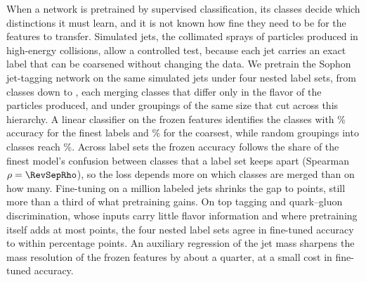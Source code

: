 When a network is pretrained by supervised classification, its classes decide which distinctions it must learn, and it
is not known how fine they need to be for the features to transfer.
Simulated jets, the collimated sprays of particles produced in high-energy collisions, allow a controlled test,
because each jet carries an exact label that can be coarsened without changing the data.
We pretrain the Sophon jet-tagging network on the same simulated jets under four nested label sets, from \Kfull{}
classes down to \Kcoarse, each merging classes that differ only in the flavor of the particles produced, and under
groupings of the same size that cut across this hierarchy.
A linear classifier on the frozen features identifies the \Kfull{} classes with \VAccFullPct\% accuracy for the
finest labels and \VAccCoarsePct\% for the coarsest, while random groupings into \Kcoarse{} classes reach
\VAccRandPct\%.
Across \VSepNWord{} label sets the frozen accuracy follows the share of the finest model's confusion between classes
that a label set keeps apart (Spearman $\rho=\RevSepRho$), so the loss depends more on which classes are merged than on
how many.
Fine-tuning on a million labeled jets shrinks the gap to \VDFtJcTwoCoarse{} points, still more than a third of what
pretraining gains.
On top tagging and quark--gluon discrimination, whose inputs carry little flavor information and where pretraining
itself adds at most \VDFtQgAccGain{} points, the four nested label sets agree in fine-tuned accuracy to within
\VFtQgAccRange{} percentage points.
An auxiliary regression of the jet mass sharpens the mass resolution of the frozen features by about a quarter, at a small cost in fine-tuned accuracy.
